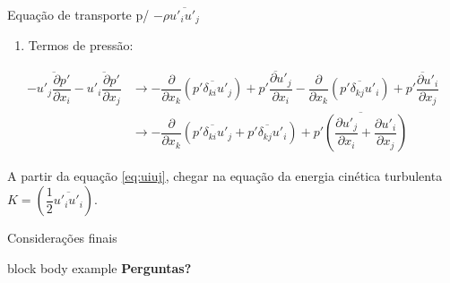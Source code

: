 \documentclass[10pt]{beamer}
\newcommand{\ddx}[2]{\dfrac{\partial #1}{\partial x_{#2}}}
\newcommand{\ddxp}[2]{\dfrac{\partial }{\partial x_{#2}}\left(#1\right)}
\newcommand{\m}[1]{\overline{#1}}
\begin{document}
\begin{frame}{Equação de transporte p/ $ -\rho \m{u'_i u'_j} $}
	\begin{enumerate}[$\bullet$]
		\item Termos de pressão:
	\end{enumerate}

	\begin{align*}
	- \m{u'_j\ddx{p'}{i}} - \m{u'_i\ddx{p'}{j}} 
	&\rightarrow - \ddxp{\m{p' \delta_{ki} u'_j}}{k} + \m{p'\ddx{u'_j}{i}} - \ddxp{\m{p' \delta_{kj} u'_i}}{k} + \m{p'\ddx{u'_i}{j}} \\
	&\rightarrow - \ddxp{\m{p' \delta_{ki} u'_j} + \m{p' \delta_{kj} u'_i}}{k} + \m{p'\left( \ddx{u'_j}{i} + \ddx{u'_i}{j} \right)}
	\end{align*}
	
	A partir da equação \ref{eq:uiuj}, chegar na equação da energia cinética turbulenta $ K = \left( \dfrac{1}{2} \m{u'_i u'_i} \right) $.

\end{frame}

\begin{frame}[b]{Considerações finais}
	\vfill
	\begin{beamercolorbox}[wd=\textwidth,rounded=true,shadow=true]{block body example}
		\vfill
		\centering \textbf{Perguntas?}
		\vspace*{10pt}
	\end{beamercolorbox}
	\vfill
	\doclicenseThis
\end{frame}
\end{document}
